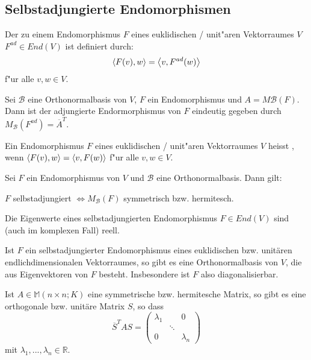 \documentclass[11pt, a4paper]{article}
\begin{document}
\subsection{Selbstadjungierte Endomorphismen}


\begin{definition}
Der zu einem Endomorphismus $F$ eines euklidischen / unit"aren Vektorraumes $V$  $F^{ad} \in End(V)$ ist definiert durch:
$$
\left\langle {F(v)} , {w} \right\rangle = \left\langle {v} , {F^{ad}(w)} \right\rangle
$$
f"ur alle $v, w \in V$.
\end{definition}

\begin{remark}
Sei $\mathcal{B}$ eine Orthonormalbasis von $V$, $F$ ein Endomorphismus und $A = M\mathcal{B}(F)$. Dann ist der adjungierte Endormorphismus von $F$ eindeutig gegeben durch $M_\mathcal{B}(F^{ad}) = \overline{A}^T$.
\end{remark}

\begin{definition}
Ein Endomorphismus $F$ eines euklidischen / unit"aren Vektorraumes $V$ heisst , wenn $\left\langle {F(v)} , {w} \right\rangle = \left\langle {v} , {F(w)} \right\rangle$ f"ur alle $v, w \in V$.
\end{definition}

\begin{theorem}
Sei $F$ ein Endomorphismus von \(V\) und \(\mathcal{B}\) eine Orthonormalbasis. Dann gilt: 

\(F\) selbstadjungiert $\Leftrightarrow M_{\mathcal{B}}(F)$ symmetrisch bzw. hermitesch.
\end{theorem}

\begin{lemma}
Die Eigenwerte eines selbstadjungierten Endomorphismus $F \in End(V)$ sind (auch im komplexen Fall) reell. 
\end{lemma}

\begin{theorem}
Ist \(F\) ein selbstadjungierter Endomorphismus eines euklidischen bzw. unitären endlichdimensionalen Vektorraumes, so gibt es eine Orthonormalbasis von \(V\), die aus Eigenvektoren von \(F\) besteht. Insbesondere ist $F$ also diagonalisierbar.
\end{theorem}

\begin{theorem}
Ist \(A \in \mathbb{M}(n \times n ; K)\) eine symmetrische bzw. hermitesche Matrix, so
gibt es eine orthogonale bzw. unitäre Matrix $S$, so dass
$$
\overline{S}^T A S = 
\left(\begin{array}{ccc}\lambda_{1} & & 0 
\\ & \ddots & 
\\ 0 & & \lambda_{n}\end{array}\right)
$$
mit $\lambda_1, ..., \lambda_n \in \mathbb{R}$.
\end{theorem}
\end{document}
